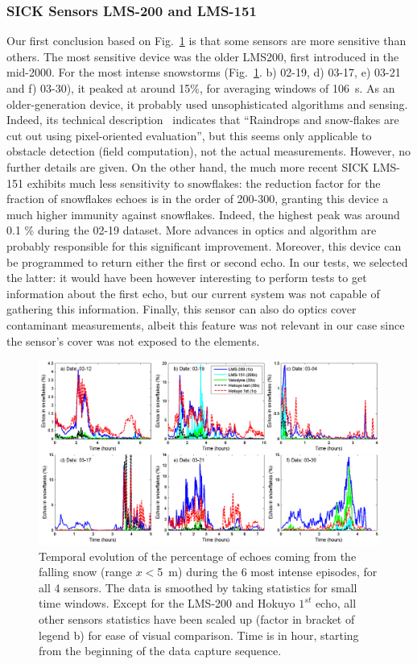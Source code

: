 \subsubsection{SICK Sensors LMS-200 and LMS-151}
Our first conclusion based on Fig.~\ref{fig:TimingSnow} is that some sensors are more sensitive than others. The most sensitive device was the older LMS200, first introduced in the mid-2000. For the most intense snowstorms (Fig.~\ref{fig:TimingSnow}. b) 02-19, d) 03-17, e) 03-21 and f) 03-30), it peaked at around 15\%, for averaging windows of \SI{106}{\second}. As an older-generation device, it probably used unsophisticated algorithms and sensing. Indeed, its technical description~\cite{LMS200Manual} indicates that ``Raindrops and snow-flakes are cut out using pixel-oriented evaluation'', but this seems only applicable to  obstacle detection (field computation), not the actual measurements. However, no further details are given. On the other hand, the much more recent SICK LMS-151 exhibits much less sensitivity to snowflakes: the reduction factor for the fraction of snowflakes echoes is in the order of 200-300, granting this device a much higher immunity against snowflakes. Indeed, the highest peak was around 0.1 \% during the 02-19 dataset. More advances in optics and algorithm are probably responsible for this significant improvement. Moreover, this device can be programmed to return either the first or second echo. In our tests, we selected the latter: it would have been however interesting to perform tests to get information about the first echo, but our current system was not capable of gathering this information. Finally, this sensor can also do optics cover contaminant measurements, albeit this feature was not relevant in our case since the sensor's cover was not exposed to the elements.

\begin{figure}[th]
    \centering
    \includegraphics[width=0.98\linewidth]{./img/TimingSnow.png}
    \caption{Temporal evolution of the percentage of echoes coming from the falling snow (range $x<$\SI{5}{\meter}) during the 6 most intense episodes, for all 4 sensors. The data is smoothed by taking statistics for small time windows. Except for the LMS-200 and Hokuyo $1^{st}$ echo, all other sensors statistics have been scaled up (factor in bracket of legend b) for ease of visual comparison. Time is in hour, starting from the beginning of the data capture sequence.}
    \label{fig:TimingSnow}
\end{figure}


